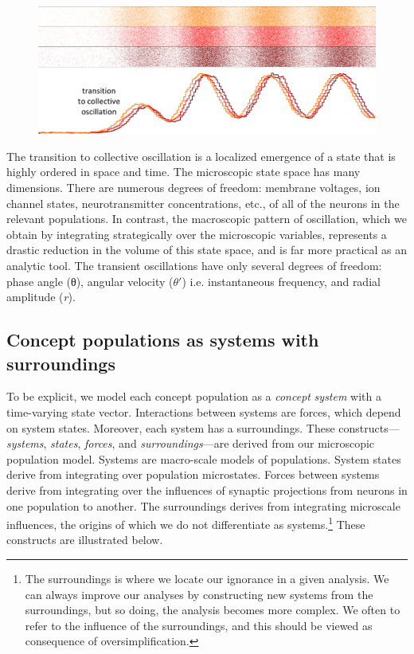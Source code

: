   
\begin{figure}
\includegraphics[width=\textwidth]{figures/Tilsen-img10.png}
\caption{\missingcaption}
\label{fig:}
\end{figure}
 

  The transition to collective oscillation is a localized emergence of a state that is highly ordered in space and time. The microscopic state space has many dimensions. There are numerous degrees of freedom: membrane voltages, ion channel states, neurotransmitter concentrations, etc., of all of the neurons in the relevant populations. In contrast, the macroscopic pattern of oscillation, which we obtain by integrating strategically over the microscopic variables, represents a drastic reduction in the volume of this state space, and is far more practical as an analytic tool. The transient oscillations have only several degrees of freedom: phase angle (θ), angular velocity ($\theta ′$) i.e. instantaneous frequency, and radial amplitude (\textit{r}).

\subsection{{\textbf{Concept populations as systems with surroundings}}} 

To be explicit, we model each concept population as a \textit{concept} \textit{system} with a time-varying state vector. Interactions between systems are forces, which depend on system states. Moreover, each system has a surroundings. These constructs—\textit{systems}, \textit{states}, \textit{forces}, and \textit{surroundings}—are derived from our microscopic population model. Systems are macro-scale models of populations. System states derive from integrating over population microstates. Forces between systems derive from integrating over the influences of synaptic projections from neurons in one population to another. The surroundings derives from integrating microscale influences, the origins of which we do not differentiate as systems.\footnote{The surroundings is where we locate our ignorance in a given analysis. We can always improve our analyses by constructing new systems from the surroundings, but so doing, the analysis becomes more complex. We often to refer to the influence of the surroundings, and this should be viewed as consequence of oversimplification.} These constructs are illustrated below.

